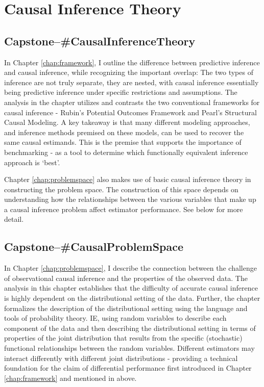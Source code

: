 \documentclass[../main.tex]{subfiles}
\begin{document}
\section{Causal Inference Theory}

\subsection*{\textbf{Capstone--\#CausalInferenceTheory}}
\label{lo:CausalInferenceTheory}

In Chapter \ref{chap:framework}, I outline the difference between predictive inference and causal inference, while recognizing the important overlap: The two types of inference are not truly separate, they are nested, with causal inference essentially being predictive inference under specific restrictions and assumptions. The analysis in the chapter utilizes and contrasts the two conventional frameworks for causal inference - Rubin's Potential Outcomes Framework and Pearl's Structural Causal Modeling. A key takeaway is that many different modeling approaches, and inference methods premised on these models, can be used to recover the same causal estimands. This is the premise that supports the importance of benchmarking - as a tool to determine which functionally equivalent inference approach is `best'.

\vspace{\baselineskip}

Chapter \ref{chap:problemspace} also makes use of basic causal inference theory in constructing the problem space. The construction of this space depends on understanding how the relationships between the various variables that make up a causal inference problem affect estimator performance. See  below for more detail.


\subsection*{\textbf{Capstone--\#CausalProblemSpace}}
\label{lo:CausalProblemSpace}

In Chapter \ref{chap:problemspace}, I describe the connection between the challenge of observational causal inference and the properties of the observed data. The analysis in this chapter establishes that the difficulty of accurate causal inference is highly dependent on the distributional setting of the data. Further, the chapter formalizes the description of the distributional setting using the language and tools of probability theory. IE, using random variables to describe each component of the data and then describing the distributional setting in terms of properties of the joint distribution that results from the specific (stochastic) functional relationships between the random variables. Different estimators may interact differently with different joint distributions - providing a technical foundation for the claim of differential performance first introduced in Chapter \ref{chap:framework} and mentioned in  above.
\end{document}
